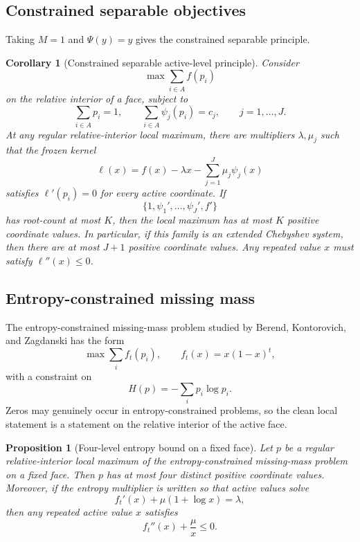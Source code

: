 \documentclass[11pt]{article}
\newtheorem{proposition}[theorem]{Proposition}
\newtheorem{corollary}[theorem]{Corollary}
\theoremstyle{definition}
\begin{document}
\subsection{Constrained separable objectives}

Taking $M=1$ and $\Psi(y)=y$ gives the constrained separable principle.

\begin{corollary}[Constrained separable active-level principle]\label{cor:constrained-separable}
Consider
\[
  \max \sum_{i\in A} f(p_i)
\]
on the relative interior of a face, subject to
\[
  \sum_{i\in A}p_i=1,
  \qquad
  \sum_{i\in A}\psi_j(p_i)=c_j,
  \qquad j=1,\ldots,J.
\]
At any regular relative-interior local maximum, there are multipliers $\lambda,\mu_j$ such that the frozen kernel
\[
  \ell(x)=f(x)-\lambda x-
  \sum_{j=1}^J\mu_j\psi_j(x)
\]
satisfies $\ell'(p_i)=0$ for every active coordinate.  If
\[
  \{1,\psi_1',\ldots,\psi_J',f'\}
\]
has root-count at most $K$, then the local maximum has at most $K$ positive coordinate values.  In particular, if this family is an extended Chebyshev system, then there are at most $J+1$ positive coordinate values.  Any repeated value $x$ must satisfy $\ell''(x)\le0$.
\end{corollary}

\subsection{Entropy-constrained missing mass}

The entropy-constrained missing-mass problem studied by Berend, Kontorovich, and Zagdanski \cite{BKZ} has the form
\[
  \max \sum_i f_t(p_i),
  \qquad f_t(x)=x(1-x)^t,
\]
with a constraint on
\[
  H(p)=-\sum_i p_i\log p_i.
\]
Zeros may genuinely occur in entropy-constrained problems, so the clean local statement is a statement on the relative interior of the active face.

\begin{proposition}[Four-level entropy bound on a fixed face]\label{prop:entropy-four}
Let $p$ be a regular relative-interior local maximum of the entropy-constrained missing-mass problem on a fixed face.  Then $p$ has at most four distinct positive coordinate values.  Moreover, if the entropy multiplier is written so that active values solve
\[
  f_t'(x)+\mu(1+\log x)=\lambda,
\]
then any repeated active value $x$ satisfies
\[
  f_t''(x)+\frac{\mu}{x}\le 0.
\]
\end{proposition}
\end{document}
